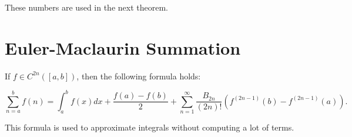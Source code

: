 These numbers are used in the next theorem.

\section{Euler-Maclaurin Summation}

If \(f \in C^{2n}([a, b])\), then the following formula holds: 

\[
    \sum_{n = a}^{b} f(n) = \int_a^b f(x) dx + \frac{f(a) - f(b)}{2} + \sum_{n = 1}^{\infty} \frac{B_{2n}}{(2n)!} (f^{(2n - 1)}(b) - f^{(2n - 1)}(a)).
\]

This formula is used to approximate integrals without computing a lot of terms.





